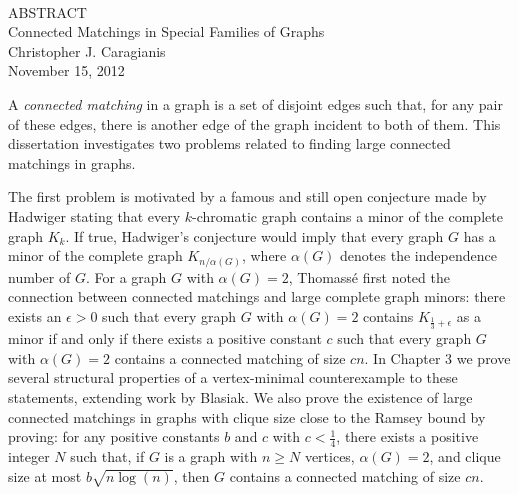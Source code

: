 \begin{center}
~\\
\vspace{1in}
ABSTRACT\\
\vspace{-0.2in}
Connected Matchings in Special Families of Graphs\\

Christopher J. Caragianis\\

November 15, 2012\\
\end{center}

A {\em connected matching} in a graph is a set of disjoint edges such that, for any pair of these edges,
there is another edge of the graph incident to both of them.
This dissertation investigates two problems related to finding large connected matchings in graphs.

The first problem is motivated by a famous and still open conjecture made by Hadwiger stating
that every $k$-chromatic graph contains a minor of the complete graph $K_k$.  If true, Hadwiger's conjecture
would imply that every graph $G$ has a minor of the complete graph $K_{n/\alpha(G)}$, where $\alpha(G)$
denotes the independence number of $G$.
For a graph $G$ with $\alpha(G)=2$, Thomass\'{e} first noted the connection between connected matchings
and large complete graph minors: there exists an $\epsilon>0$ such that every graph $G$ with $\alpha(G)=2$
contains $K_{\frac{1}{3}+\epsilon}$ as a minor if and only if there exists a positive constant $c$ such that 
every graph $G$ with $\alpha(G)=2$ contains a connected matching of size $c n$.  
In Chapter 3 we prove several structural properties of a vertex-minimal counterexample to these statements, 
extending work by Blasiak.
We also prove the existence of large connected matchings in graphs with clique size close to the Ramsey bound by proving:
for any positive constants $b$ and $c$ with $c<\frac{1}{4}$, there exists a positive integer $N$ such that,
if $G$ is a graph with $n\geq N$ vertices, $\alpha(G)=2$, and clique size at most $b \sqrt{n \log(n)}$,
then $G$ contains a connected matching of size $cn$.

